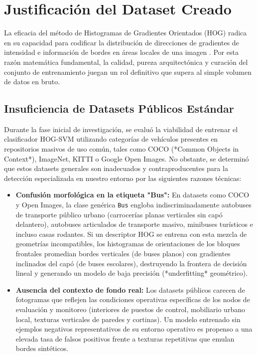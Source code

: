 \documentclass[12pt]{article}
\begin{document}
\section{Justificación del Dataset Creado}
La eficacia del método de Histogramas de Gradientes Orientados (HOG) radica en su capacidad para codificar la distribución de direcciones de gradientes de intensidad e información de bordes en áreas locales de una imagen \cite{dalal2005hog}. Por esta razón matemática fundamental, la calidad, pureza arquitectónica y curación del conjunto de entrenamiento juegan un rol definitivo que supera al simple volumen de datos en bruto.

\subsection{Insuficiencia de Datasets Públicos Estándar}
Durante la fase inicial de investigación, se evaluó la viabilidad de entrenar el clasificador HOG-SVM utilizando categorías de vehículos presentes en repositorios masivos de uso común, tales como COCO (*Common Objects in Context*), ImageNet, KITTI o Google Open Images. No obstante, se determinó que estos datasets generales son inadecuados y contraproducentes para la detección especializada en nuestro entorno por las siguientes razones técnicas:

\begin{itemize}
    \item \textbf{Confusión morfológica en la etiqueta "Bus":} En datasets como COCO y Open Images, la clase genérica \texttt{Bus} engloba indiscriminadamente autobuses de transporte público urbano (carrocerías planas verticales sin capó delantero), autobuses articulados de transporte masivo, minibuses turísticos e incluso casas rodantes. Si un descriptor HOG se entrena con esta mezcla de geometrías incompatibles, los histogramas de orientaciones de los bloques frontales promedian bordes verticales (de buses planos) con gradientes inclinados del capó (de buses escolares), destruyendo la frontera de decisión lineal y generando un modelo de baja precisión (*underfitting* geométrico).
    \item \textbf{Ausencia del contexto de fondo real:} Los datasets públicos carecen de fotogramas que reflejen las condiciones operativas específicas de los nodos de evaluación y monitoreo (interiores de puestos de control, mobiliario urbano local, texturas verticales de paredes y cortinas). Un modelo entrenado sin ejemplos negativos representativos de su entorno operativo es propenso a una elevada tasa de falsos positivos frente a texturas repetitivas que emulan bordes sintéticos.
\end{itemize}
\end{document}
